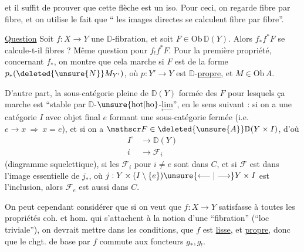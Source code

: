 
et il suffit de prouver que cette flèche est un iso. Pour ceci, on regarde fibre par fibre, et on utilise le fait que `` les images directes se calculent fibre par fibre''.

\uline{Question} Soit $f:X\longrightarrow Y$ une $\mathbb D$-fibration, et soit $F\in\mathrm{Ob}\,\mathbb D(Y)$. Alors $f_* f^*F$ se calcule-t-il     fibres ? Même question pour $f_! f^*F$. Pour la première propriété, concernant $f_*$, on montre que cela marche si $F$ est de la forme $p_*(\deleted{\unsure{N}}M_{Y'})$, où $p:Y'\longrightarrow Y$ est $\mathbb D$-\uline{propre}, et $M\in\mathrm{Ob}\,A$.

D'autre part, la sous-catégorie pleine  de $\mathbb D(Y)$ formée des $F$ pour lesquels ça marche est  ``stable par $\mathbb D$-$\unsure{\mathrm{hot}|\mathrm{ho}}$-$\underset{\longleftarrow}{\mathrm{lim}}$'', en le sens suivant : si on a une catégorie $I$ avec objet final $e$ formant une sous-catégorie fermée (i.e. $e\longrightarrow x\ \Longrightarrow\ x=e$), et si on a $\mathscr F\in\deleted{\unsure{A}}\mathbb D(Y\times I)$, d'où
\[
\begin{aligned}
I^\circ&\longrightarrow\mathbb D(Y)\\
i&\longrightarrow\mathscr F_i
\end{aligned}
\]
(diagramme squelettique), si les $\mathscr F_i$ pour $i\ne e$ sont dans $C$, et si $\mathscr F$ est dans l'image essentielle de $j_*$, où $j:Y\times(I\setminus\{e\})\unsure{\longleftarrow|\longrightarrow}Y\times I$ est l'inclusion, alors $\mathscr F_e$ est aussi dans $C$.

On peut cependant considérer que si on veut que $f:X\longrightarrow Y$ satisfasse à toutes les propriétés coh. et hom. qui s'attachent à la notion d'une ``fibration'' (``loc triviale''), on devrait mettre dans les conditions, que $f$ est \uline{lisse}, et \uline{propre}, donc que le chgt. de base par $f$ commute aux foncteurs $g_*,g_!$.
